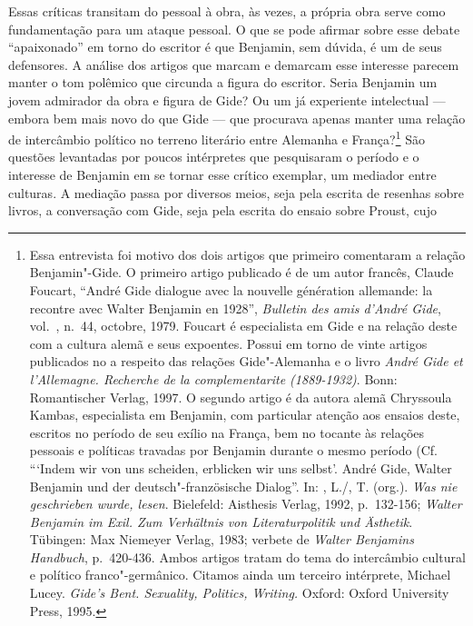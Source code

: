Essas críticas transitam do pessoal à obra, às vezes, a própria obra
serve como fundamentação para um ataque pessoal. O que se pode afirmar
sobre esse debate ``apaixonado'' em torno do escritor é que Benjamin,
sem dúvida, é um de seus defensores. A análise dos artigos que marcam e
demarcam esse interesse parecem manter o tom polêmico que circunda a
figura do escritor. Seria Benjamin um jovem admirador da obra e figura
de Gide? Ou um já experiente intelectual --- embora bem mais novo do que
Gide --- que procurava apenas manter uma relação de intercâmbio político
no terreno literário entre Alemanha e França?\footnote{Essa entrevista
  foi motivo dos dois artigos que primeiro comentaram a relação
  Benjamin"-Gide. O primeiro artigo publicado é de um autor francês,
  Claude Foucart, ``André Gide dialogue avec la nouvelle génération
  allemande: la recontre avec Walter Benjamin en 1928'', \emph{Bulletin des amis d'André Gide}, vol.~, n.~44, octobre, 1979. Foucart é especialista em Gide e na relação
  deste com a cultura alemã e seus expoentes. Possui em torno de vinte
  artigos publicados no  a respeito das relações Gide"-Alemanha e o
  livro \emph{André Gide et l'Allemagne. Recherche de la
  complementarite (1889-1932)}. Bonn: Romantischer Verlag, 1997. O
  segundo artigo é da autora alemã Chryssoula Kambas, especialista em
  Benjamin, com particular atenção aos ensaios deste, escritos no
  período de seu exílio na França, bem no tocante às relações pessoais e
  políticas travadas por Benjamin durante o mesmo período (Cf. ```Indem
  wir von uns scheiden, erblicken wir uns selbst'. André Gide, Walter
  Benjamin und der deutsch"-französische Dialog''. In: , L./, T. (org.). \emph{Was nie geschrieben wurde, lesen}. Bielefeld:
  Aisthesis Verlag, 1992, p.~132-156; \emph{Walter Benjamin im Exil. Zum
  Verhältnis von Literaturpolitik und Ästhetik}. Tübingen: Max Niemeyer
  Verlag, 1983; verbete de \emph{Walter Benjamins Handbuch}, p.~420-436.
  Ambos artigos tratam do tema do intercâmbio cultural e político
  franco"-germânico. Citamos ainda um terceiro intérprete, Michael Lucey. %
  \emph{Gide's Bent. Sexuality, Politics, Writing.} Oxford: Oxford
  University Press, 1995.} São questões levantadas por poucos
intérpretes que pesquisaram o período e o interesse de Benjamin em se
tornar esse crítico exemplar, um mediador entre culturas. A mediação
passa por diversos meios, seja pela escrita de resenhas sobre livros, a
conversação com Gide, seja pela escrita do ensaio sobre Proust, cujo
